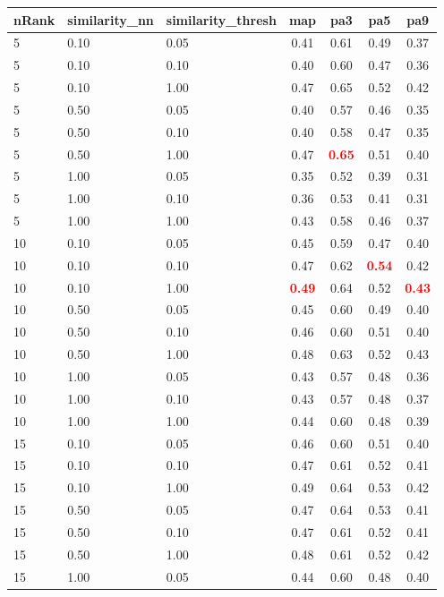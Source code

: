   
\begin{table} 
\begin{center} 
\scriptsize 
 \setlength{\tabcolsep}{.16667em} 
\begin{tabular}{lllcccc} 
nRank & similarity\_nn & similarity\_thresh & map & pa3 & pa5 & pa9 \\ 
\hline 
 5 & 0.10 & 0.05 & 0.41 & 0.61 & 0.49 & 0.37 \\ 
 5 & 0.10 & 0.10 & 0.40 & 0.60 & 0.47 & 0.36 \\ 
 5 & 0.10 & 1.00 & 0.47 & 0.65 & 0.52 & 0.42 \\ 
 5 & 0.50 & 0.05 & 0.40 & 0.57 & 0.46 & 0.35 \\ 
 5 & 0.50 & 0.10 & 0.40 & 0.58 & 0.47 & 0.35 \\ 
 5 & 0.50 & 1.00 & 0.47 & \textbf{\textcolor{red}{0.65}} & 0.51 & 0.40 \\ 
 5 & 1.00 & 0.05 & 0.35 & 0.52 & 0.39 & 0.31 \\ 
 5 & 1.00 & 0.10 & 0.36 & 0.53 & 0.41 & 0.31 \\ 
 5 & 1.00 & 1.00 & 0.43 & 0.58 & 0.46 & 0.37 \\ 
10 & 0.10 & 0.05 & 0.45 & 0.59 & 0.47 & 0.40 \\ 
10 & 0.10 & 0.10 & 0.47 & 0.62 & \textbf{\textcolor{red}{0.54}} & 0.42 \\ 
10 & 0.10 & 1.00 & \textbf{\textcolor{red}{0.49}} & 0.64 & 0.52 & \textbf{\textcolor{red}{0.43}} \\ 
10 & 0.50 & 0.05 & 0.45 & 0.60 & 0.49 & 0.40 \\ 
10 & 0.50 & 0.10 & 0.46 & 0.60 & 0.51 & 0.40 \\ 
10 & 0.50 & 1.00 & 0.48 & 0.63 & 0.52 & 0.43 \\ 
10 & 1.00 & 0.05 & 0.43 & 0.57 & 0.48 & 0.36 \\ 
10 & 1.00 & 0.10 & 0.43 & 0.57 & 0.48 & 0.37 \\ 
10 & 1.00 & 1.00 & 0.44 & 0.60 & 0.48 & 0.39 \\ 
15 & 0.10 & 0.05 & 0.46 & 0.60 & 0.51 & 0.40 \\ 
15 & 0.10 & 0.10 & 0.47 & 0.61 & 0.52 & 0.41 \\ 
15 & 0.10 & 1.00 & 0.49 & 0.64 & 0.53 & 0.42 \\ 
15 & 0.50 & 0.05 & 0.47 & 0.64 & 0.53 & 0.41 \\ 
15 & 0.50 & 0.10 & 0.47 & 0.61 & 0.52 & 0.41 \\ 
15 & 0.50 & 1.00 & 0.48 & 0.61 & 0.52 & 0.42 \\ 
15 & 1.00 & 0.05 & 0.44 & 0.60 & 0.48 & 0.40 \\ 

\end{tabular}
\end{center}
\end{table}
